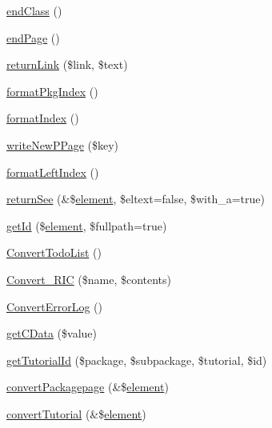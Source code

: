 \begin{DoxyCompactItemize}
\item 
\hyperlink{class_c_h_mdefault_converter_ae4962a5674fd1be0f3795cb72f2974bf}{end\-Class} ()
\item 
\hyperlink{class_c_h_mdefault_converter_a7e7c9e2e7d88f78fa6f8bf8776c443e5}{end\-Page} ()
\item 
\hyperlink{class_c_h_mdefault_converter_af40fcd39ab514ae82e555a451dd72dc2}{return\-Link} (\$link, \$text)
\item 
\hyperlink{class_c_h_mdefault_converter_a37200c9f589ee4eaeed637c5ce1af356}{format\-Pkg\-Index} ()
\item 
\hyperlink{class_c_h_mdefault_converter_a963f73984fad30cb1776cd293eeb7db7}{format\-Index} ()
\item 
\hyperlink{class_c_h_mdefault_converter_a6b7e21b9959092d614a9c07a447c2643}{write\-New\-P\-Page} (\$key)
\item 
\hyperlink{class_c_h_mdefault_converter_a39bb30299ec5d6ba31096e51f2bcc4b4}{format\-Left\-Index} ()
\item 
\hyperlink{class_c_h_mdefault_converter_a016c461f5a37e15d2a431c7083c904a3}{return\-See} (\&\$\hyperlink{bug-904820_8php_aa94081298ab2dfd0f261cce6c203d9aa}{element}, \$eltext=false, \$with\-\_\-a=true)
\item 
\hyperlink{class_c_h_mdefault_converter_a5308a5a2e0656a3300684dde375b2e41}{get\-Id} (\$\hyperlink{bug-904820_8php_aa94081298ab2dfd0f261cce6c203d9aa}{element}, \$fullpath=true)
\item 
\hyperlink{class_c_h_mdefault_converter_a756b83c7febf175624cf1d2562bf02ae}{\-Convert\-Todo\-List} ()
\item 
\hyperlink{class_c_h_mdefault_converter_ad3f7aa571c77bab78c11f387be1ec587}{\-Convert\-\_\-\-R\-I\-C} (\$name, \$contents)
\item 
\hyperlink{class_c_h_mdefault_converter_a5a02e88d6dba03b66f46fd411e5ac2c2}{\-Convert\-Error\-Log} ()
\item 
\hyperlink{class_c_h_mdefault_converter_a37fe6f6ddd1cd15d360788064dce7a43}{get\-C\-Data} (\$value)
\item 
\hyperlink{class_c_h_mdefault_converter_a98de4e6484c42e491de454411f606871}{get\-Tutorial\-Id} (\$package, \$subpackage, \$tutorial, \$id)
\item 
\hyperlink{class_c_h_mdefault_converter_ab5f3dde79110c1809860e42205e9b787}{convert\-Packagepage} (\&\$\hyperlink{bug-904820_8php_aa94081298ab2dfd0f261cce6c203d9aa}{element})
\item 
\hyperlink{class_c_h_mdefault_converter_a129673c76d85dfee7bd2170d59b33fba}{convert\-Tutorial} (\&\$\hyperlink{bug-904820_8php_aa94081298ab2dfd0f261cce6c203d9aa}{element})

\end{DoxyCompactItemize}
